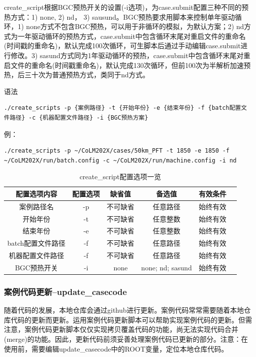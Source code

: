 create\_script根据BGC预热开关的设置(-i选项)，为case.submit配置三种不同的预热方式：1) none, 2) nd， 3) sausund。BGC预热要求用脚本来控制单年驱动循环，1) none方式不包含BGC预热，可以用于非循环的模拟，为默认方案；2) nd方式为一年驱动循环的预热方式，case.submit中包含循环末尾对重启文件的重命名(时间戳的重命名)，默认完成100次循环，可生脚本后通过手动编辑case.submit进行修改。3) sasund方式同为1年驱动循环的预热，case.submit中包含循环末尾对重启文件的重命名(时间戳重命名)，默认完成130次循环，但前100次为半解析加速预热，后三十次为普通预热方式，类同于nd方式。

语法
\begin{lstlisting}
./create_scripts -p {案例路径} -t {开始年份} -e {结束年份} -f {batch配置文件路径} -c {机器配置文件路径} -i {BGC预热方案}
\end{lstlisting}

例：
\begin{lstlisting}
./create_scripts -p ~/CoLM202X/cases/50km_PFT -t 1850 -e 1850 -f ~/CoLM202X/run/batch.config -c ~/CoLM202X/run/machine.config -i nd
\end{lstlisting}

\begin{table}[!htbp]
\renewcommand{\arraystretch}{1.5}
\centering
\caption{create\_script配置选项一览}\label{tab:createscript_option}
\begin{tabular}{
cccccc} \toprule
\textbf{配置选项内容} & \textbf{配置选项} & \textbf{缺省值} & \textbf{备选值} & \textbf{有效条件}\\ \midrule
案例路径名 & -p & 不可缺省 & 任意路径 & 始终有效 \\
开始年份 & -t & 不可缺省 & 任意整数 & 始终有效\\
结束年份 & -e & 不可缺省 & 任意整数 & 始终有效\\
batch配置文件路径 & -f & 不可缺省 & 任意路径 & 始终有效 \\
机器配置文件路径 & -f & 不可缺省 & 任意路径 & 始终有效 \\
BGC预热开关 & -i &none & none; nd; sasund& 始终有效 \\
\bottomrule
\end{tabular}
\end{table}

\subsubsection{案例代码更新--update\_casecode}

随着代码的发展，本地仓库会通过github进行更新。案例代码常常需要随着本地仓库代码的更新而更新。运用案例代码更新脚本可以帮助实现案例代码的更新。但需注意，案例代码更新脚本仅仅实现拷贝覆盖代码的功能，尚无法实现代码合并(merge)的功能。因此，更新代码前须妥善处理案例代码已更新的部分。注意：在使用前，需要编辑update\_casecode中的ROOT变量，定位本地仓库代码。

